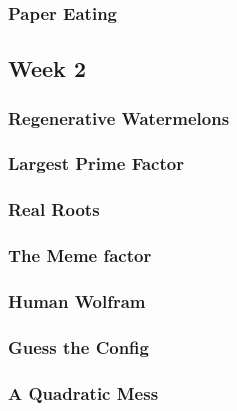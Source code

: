 \documentclass[titlepage=true]{scrartcl}
\begin{document}
        \subsubsection{Paper Eating}
            \label{1-1-7}
            
        \newpage
{}
    \subsection{Week 2}

        \subsubsection{Regenerative Watermelons}
            \label{1-2-1}
            
        \newpage 

        \subsubsection{Largest Prime Factor}
            \label{1-2-2}       
            
        \newpage

        \subsubsection{Real Roots}
            \label{1-2-3}
            
        \newpage 

        \subsubsection{The Meme factor}
            \label{1-2-4}
            
        \newpage

        \subsubsection{Human Wolfram}
            \label{1-2-5}
            
        \newpage 

        \subsubsection{Guess the Config}
            \label{1-2-6}
            
        \newpage 
        
        \subsubsection{A Quadratic Mess}
            \label{1-2-7}
            
        \newpage
\end{document}
